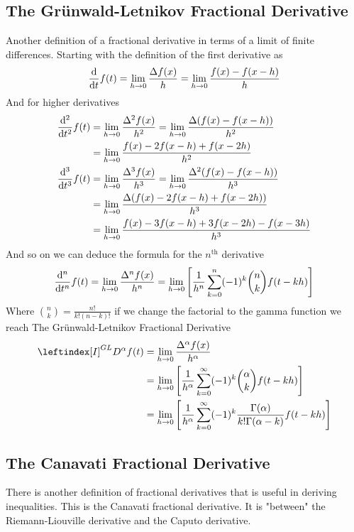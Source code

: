 \subsection{The Grünwald-Letnikov Fractional Derivative}
Another definition of a fractional derivative in terms of a limit of finite differences.
Starting with the definition of the first derivative as
\[
\dv{}{t} f(t) = \lim_{h \to 0} \frac{\Delta f(x)}{h} = \lim_{h \to 0} \frac{f(x)-f(x-h)}{h}
\]
And for higher derivatives
\begin{align*}
    \dv[2]{}{t} f(t) &= \lim_{h \to 0} \frac{\Delta^2 f(x)}{h^2} = \lim_{h \to 0} \frac{\Delta (f(x)-f(x-h))}{h^2}
    \\
    &=\lim_{h \to 0} \frac{f(x)-2f(x-h)+f(x-2h)}{h^2}
    \\
    \dv[3]{}{t} f(t) &= \lim_{h \to 0} \frac{\Delta^3 f(x)}{h^3} = \lim_{h \to 0} \frac{\Delta^2 (f(x)-f(x-h))}{h^3}
    \\
    &=\lim_{h \to 0} \frac{\Delta(f(x)-2f(x-h)+f(x-2h))}{h^3}
    \\
    &=\lim_{h \to 0} \frac{f(x)-3f(x-h)+3f(x-2h)-f(x-3h)}{h^3}
\end{align*}
And so on we can deduce the formula for the $n^{\text{th}}$ derivative
\[
    \dv[n]{}{t} f(t) = \lim_{h \to 0} \frac{\Delta^n f(x)}{h^n} 
    = \lim_{h \to 0} \left[  \frac{1}{h^{n}} \sum_{k=0}^{n} (-1)^{k} {n \choose k} f(t-kh) \right]
\]
Where $\displaystyle {n \choose k} = \frac{n!}{k!(n-k)!}$ if we change the factorial to the gamma function 
we reach The Grünwald-Letnikov Fractional Derivative
\begin{align*}
    \leftindex[I]^{GL} {D^{\alpha}} f(t) 
    &= \lim_{h \to 0} \frac{\Delta^\alpha f(x)}{h^\alpha} 
    \\
    &= \lim_{h \to 0} \left[  \frac{1}{h^{\alpha}} \sum_{k=0}^{\infty} (-1)^{k} {\alpha \choose k} f(t-kh) \right]
    \\
    &= \lim_{h \to 0} \left[  \frac{1}{h^{\alpha}} \sum_{k=0}^{\infty} (-1)^{k} \frac{\Gamma(\alpha)}{k!\Gamma(\alpha-k)} f(t-kh) \right]
\end{align*}
\subsection{The Canavati Fractional Derivative}
There is another definition of fractional derivatives that is useful in deriving
inequalities. This is the Canavati fractional derivative. It is "between" the
Riemann-Liouville derivative and the Caputo derivative. 

